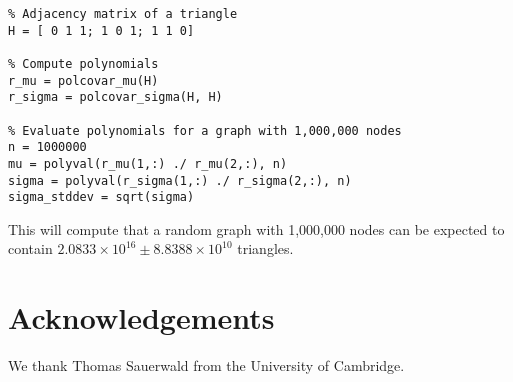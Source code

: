 \documentclass{article}
\begin{document}
\begin{verbatim}
% Adjacency matrix of a triangle
H = [ 0 1 1; 1 0 1; 1 1 0]

% Compute polynomials
r_mu = polcovar_mu(H)
r_sigma = polcovar_sigma(H, H)

% Evaluate polynomials for a graph with 1,000,000 nodes
n = 1000000
mu = polyval(r_mu(1,:) ./ r_mu(2,:), n)
sigma = polyval(r_sigma(1,:) ./ r_sigma(2,:), n)
sigma_stddev = sqrt(sigma)
\end{verbatim}
This will compute that a random graph with 1,000,000 nodes can be
expected to contain $2.0833 \times 10^{16} \pm 8.8388\times 10^{10}$
triangles.   

\section*{Acknowledgements}
We thank Thomas Sauerwald from the University of Cambridge. 



\end{document}

